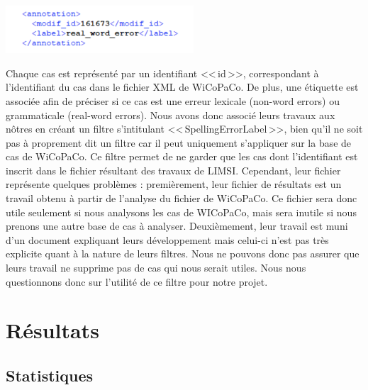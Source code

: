 \documentclass[11pt]{article}
\begin{document}
\begin{center}
\includegraphics[width=7cm]{exemple16.png} %
\end{center}

Chaque cas est repr\'{e}sent\'{e} par un identifiant <<\,id\,>>, correspondant \`{a} l'identifiant du cas dans le fichier XML de WiCoPaCo. De plus, une \'{e}tiquette est associ\'{e}e afin de pr\'{e}ciser si ce cas est une erreur lexicale (non-word errors) ou grammaticale (real-word errors). Nous avons donc associ\'{e} leurs travaux aux n\^{o}tres en cr\'{e}ant un filtre s'intitulant <<\,SpellingErrorLabel\,>>, bien qu'il ne soit pas \`{a} proprement dit un filtre car il peut uniquement s'appliquer sur la base de cas de WiCoPaCo. Ce filtre permet de ne garder que les cas dont l'identifiant est inscrit dans le fichier r\'{e}sultant des travaux de LIMSI.
\newline
\newline
Cependant, leur fichier repr\'{e}sente quelques probl\`{e}mes : premi\`{e}rement, leur fichier de r\'{e}sultats est un travail obtenu \`{a} partir de l'analyse du fichier de WiCoPaCo. Ce fichier sera donc utile seulement si nous analysons les cas de WICoPaCo, mais sera inutile si nous prenons une autre base de cas \`{a} analyser. Deuxi\`{e}mement, leur travail est muni d'un document expliquant leurs d\'{e}veloppement mais celui-ci n'est pas tr\`{e}s explicite quant \`{a} la nature de leurs filtres. Nous ne pouvons donc pas assurer que leurs travail ne supprime pas de cas qui nous serait utiles. Nous nous questionnons donc sur l'utilit\'{e} de ce filtre pour notre projet.
\newline
\newline

\section{R\'{e}sultats}

\subsection{Statistiques}

\end{document}
